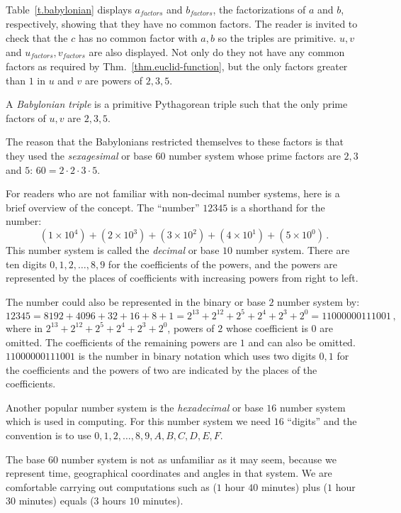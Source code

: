 Table~\ref{t.babylonian} displays $a_{\textit{factors}}$ and $b_{\textit{factors}}$, the factorizations of $a$ and $b$, respectively, showing that they have no common factors. The reader is invited to check that the $c$ has no common factor with  $a,b$ so the triples are primitive. $u,v$  and $u_{\textit{factors}}, v_{\textit{factors}}$ are also displayed. Not only do they not have any common factors as required by Thm.~\ref{thm.euclid-function}, but the only factors greater than $1$ in $u$ and $v$ are powers of $2,3,5$.
\begin{definition}
A \emph{Babylonian triple} is a primitive Pythagorean triple such that the only prime factors of $u,v$ are $2,3,5$.
\end{definition}
The reason that the Babylonians restricted themselves to these factors is that they used the \emph{sexagesimal} or base $60$ number system whose prime factors are $2,3$ and $5$: $60=2\cdot 2\cdot 3\cdot 5$.

For readers who are not familiar with non-decimal number systems,  here is a brief overview of the concept. The ``number'' $12345$ is a shorthand for the number:
\[
(1\times 10^4) + (2\times 10^3) + (3\times 10^2) + (4\times 10^1) + (5\times 10^0)\,.
\]
This number system is called the \emph{decimal} or base $10$ number system. There are ten digits $0,1,2,\ldots,8,9$ for the coefficients of the powers, and the powers are represented by the places of coefficients with increasing powers from right to left. 

The number could also be represented in the binary or base $2$ number system by:
\[
12345=8192 + 4096 + 32+16+8+1=
2^{13} + 2^{12} + 2^{5} + 2^{4} + 2^{3} + 2^0=11000000111001\,,
\]
where in $2^{13} + 2^{12} + 2^{5} + 2^{4} + 2^{3} + 2^0$, powers of $2$ whose coefficient is $0$ are omitted. The coefficients of the remaining powers are $1$ and can also be omitted. $11000000111001$ is the number in binary notation which uses two digits $0,1$ for the coefficients and the powers of two are indicated by the places of the coefficients.

Another popular number system is the \emph{hexadecimal} or base $16$ number system which is used in computing. For this number system we need $16$ ``digits'' and the convention is to use $0,1,2,\ldots,8,9,A,B,C,D,E,F$.

The base $60$ number system is not as unfamiliar as it may seem, because we represent time, geographical coordinates and angles in that system. We are comfortable carrying out computations such as ($1$ hour $40$ minutes) plus ($1$ hour $30$ minutes) equals ($3$ hours $10$ minutes).

